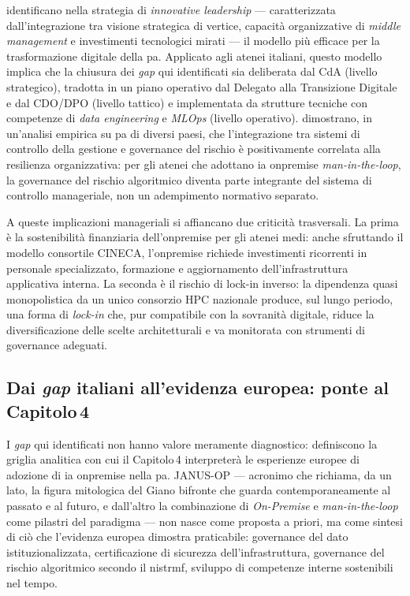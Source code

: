 \textcite{Torichnyi2025StrategicMgmt} identificano nella strategia di \textit{innovative
leadership} --- caratterizzata dall'integrazione tra visione strategica di vertice,
capacità organizzative di \textit{middle management} e investimenti tecnologici mirati ---
il modello più efficace per la trasformazione digitale della \gls{pa}. Applicato agli atenei
italiani, questo modello implica che la chiusura dei \textit{gap} qui identificati sia
deliberata dal CdA (livello strategico), tradotta in un piano operativo dal Delegato
alla Transizione Digitale e dal CDO/DPO (livello tattico) e implementata da strutture
tecniche con competenze di \textit{data engineering} e \textit{MLOps} (livello
operativo). \textcite{Pham2025MACSRG} dimostrano, in un'analisi empirica su \gls{pa} di diversi
paesi, che l'integrazione tra sistemi di controllo della gestione e governance del rischio
è positivamente correlata alla resilienza organizzativa: per gli atenei che adottano \gls{ia}
\gls{onpremise} \textit{man-in-the-loop}, la governance del rischio algoritmico
diventa parte integrante del sistema di controllo manageriale, non un adempimento
normativo separato.

A queste implicazioni manageriali si affiancano due criticità trasversali. La prima è la
sostenibilità finanziaria dell'\gls{onpremise} per gli atenei medi: anche
sfruttando il modello consortile CINECA, l'\gls{onpremise} richiede investimenti
ricorrenti in personale specializzato, formazione e aggiornamento dell'infrastruttura
applicativa interna. La seconda è il rischio di lock-in inverso: la dipendenza
quasi monopolistica da un unico consorzio HPC nazionale produce, sul lungo periodo, una
forma di \textit{lock-in} che, pur compatibile con la sovranità digitale, riduce la
diversificazione delle scelte architetturali e va monitorata con strumenti di governance
adeguati.

\subsection{Dai \textit{gap} italiani all'evidenza europea: ponte al \texorpdfstring{Capitolo\,4}{Capitolo 4}}

I \textit{gap} qui identificati non hanno valore meramente diagnostico: definiscono
la griglia analitica con cui il Capitolo\,4 interpreterà le esperienze europee di
adozione di \gls{ia} \gls{onpremise} nella \gls{pa}. JANUS-OP --- acronimo che richiama, da un
lato, la figura mitologica del Giano bifronte che guarda contemporaneamente al passato
e al futuro, e dall'altro la combinazione di \textit{On-Premise} e \textit{man-in-the-loop}
come pilastri del paradigma --- non nasce come proposta a priori, ma come sintesi di ciò
che l'evidenza europea dimostra praticabile: governance del dato istituzionalizzata,
certificazione di sicurezza dell'infrastruttura, governance del rischio algoritmico
secondo il \gls{nistrmf}, sviluppo di competenze interne sostenibili nel tempo.

